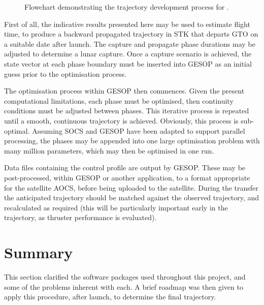 \begin{figure}
\centering
\def\svgwidth{0.6\textwidth}

\caption{Flowchart demonstrating the trajectory development process for \BW.} \label{fig:Flowchart}
\end{figure}

First of all, the indicative results presented here may be used to estimate flight time, to produce a backward propagated trajectory in STK that departs GTO on a suitable date after launch. The capture and propagate phase durations may be adjusted to determine a lunar capture. Once a capture scenario is achieved, the state vector at each phase boundary must be inserted into GESOP as an initial guess prior to the optimisation process. 

The optimisation process within GESOP then commences. Given the present computational limitations, each phase must be optimised, then continuity conditions must be adjusted between phases. This iterative process is repeated until a smooth, continuous trajectory is achieved. Obviously, this process is sub-optimal. Assuming SOCS and GESOP have been adapted to support parallel processing, the phases may be appended into one large optimisation problem with many million parameters, which may then be optimised in one run.

Data files containing the control profile are output by GESOP. These may be post-processed, within GESOP or another application, to a format appropriate for the satellite AOCS, before being uploaded to the satellite. During the transfer the anticipated trajectory should be matched against the observed trajectory, and recalculated as required (this will be particularly important early in the trajectory, as thruster performance is evaluated).

\section{Summary} \label{sec:Method-summary}

This section clarified the software packages used throughout this project, and some of the problems inherent with each. A brief roadmap was then given to apply this procedure, after launch, to determine the final trajectory.

  
\clearpage